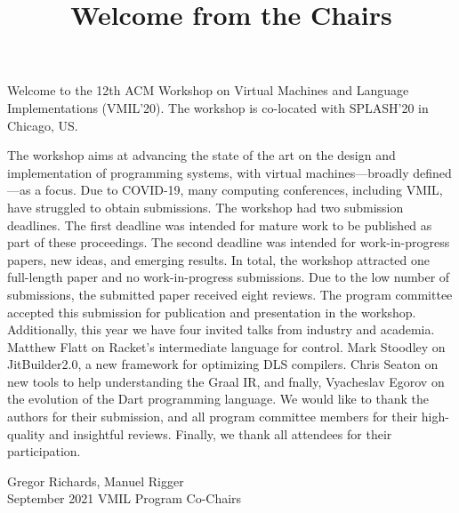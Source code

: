 \documentclass[12pt,letterpaper]{article}
\begin{document}
\title{\sffamily\bfseries Welcome from the Chairs}
\date{}

\maketitle
\thispagestyle{empty}
\pagestyle{empty}

Welcome to the 12th ACM Workshop on Virtual Machines and Language Implementations (VMIL’20). The workshop is co-located with SPLASH’20 in Chicago, US.

The workshop aims at advancing the state of the art on the design and implementation of programming systems, with virtual machines---broadly defined---as a focus.
Due to COVID-19, many computing conferences, including VMIL, have struggled to obtain submissions. The workshop had two submission deadlines. The first
deadline was intended for mature work to be published as part of these proceedings.
The second deadline was intended for work-in-progress papers, new ideas, and
emerging results. In total, the workshop attracted one full-length paper and no
work-in-progress submissions. Due to the low number of submissions, the submitted paper received eight reviews. The program committee accepted this submission
for publication and presentation in the workshop.
Additionally, this year we have four invited talks from industry and academia.
Matthew Flatt on Racket’s intermediate language for control. Mark Stoodley on
JitBuilder2.0, a new framework for optimizing DLS compilers. Chris Seaton on new
tools to help understanding the Graal IR, and fnally, Vyacheslav Egorov on the
evolution of the Dart programming language.
We would like to thank the authors for their submission, and all program
committee members for their high-quality and insightful reviews. Finally, we thank
all attendees for their participation.

\bigskip
\noindent
       \hfill Gregor Richards, Manuel Rigger\\
September 2021 \hfill VMIL Program Co-Chairs
\end{document}
